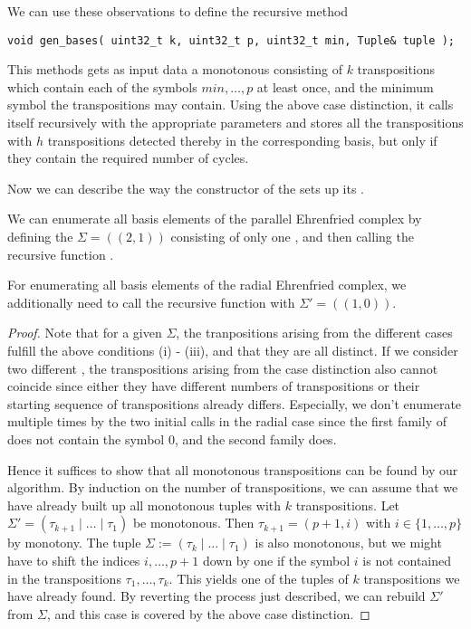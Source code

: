 We can use these observations to define the recursive method
\begin{lstlisting}
void gen_bases( uint32_t k, uint32_t p, uint32_t min, Tuple& tuple );
\end{lstlisting}
This methods gets as input data a monotonous  consisting of $k$ transpositions 
which contain each of the symbols $min, \dotsc, p$ at least once,
and the minimum symbol the transpositions may contain.
Using the above case distinction, it calls itself recursively with the appropriate parameters
and stores all the transpositions with $h$ transpositions detected thereby in the corresponding basis,
but only if they contain the required number of cycles.

Now we can describe the way the constructor of the  sets up its .

\begin{prop}
We can enumerate all basis elements of the parallel Ehrenfried complex
by defining the  $\Sigma = ((2, 1))$ consisting of only one ,
and then calling the recursive function . 

For enumerating all basis elements of the radial Ehrenfried complex,
we additionally need to call the recursive function  with $\Sigma' = ((1, 0))$.
\begin{proof}

Note that for a given $\Sigma$, the tranpositions arising from the different cases fulfill the above conditions (i) - (iii),
and that they are all distinct.
If we consider two different , 
the transpositions arising from the case distinction also cannot coincide
since either they have different numbers of transpositions or
their starting sequence of transpositions already differs.
Especially, we don't enumerate  multiple times by the two initial calls in the radial case
since the first family of  does not contain the symbol $0$, and the second family does.

Hence it suffices to show that all monotonous transpositions can be found by our algorithm.
By induction on the number of transpositions, 
we can assume that we have already built up all monotonous tuples with $k$ transpositions.
Let $\Sigma' = (\tau_{k + 1}\mid \dotsc\mid \tau_1)$ be monotonous. 
Then $\tau_{k + 1} = (p+1, i)$ with $i \in \{1, \dotsc, p\}$ by monotony.
The tuple $\Sigma := (\tau_k \mid \dotsc \mid \tau_1)$ is also monotonous, 
but we might have to shift the indices $i, \dotsc, p+1$ down by one
if the symbol $i$ is not contained in the transpositions $\tau_1, \dotsc, \tau_k$.
This yields one of the tuples of $k$ transpositions we have already found.
By reverting the process just described, we can rebuild $\Sigma'$ from $\Sigma$, 
and this case is covered by the above case distinction.
\end{proof}
\end{prop}

